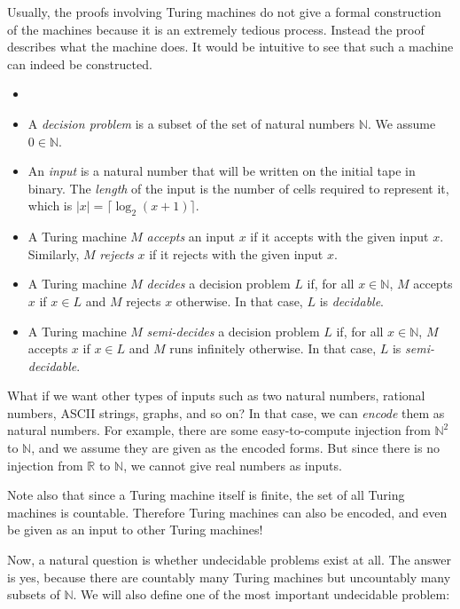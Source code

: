 	Usually, the proofs involving Turing machines do not give a formal construction of the machines because it is an extremely tedious process. Instead the proof describes what the machine does. It would be intuitive to see that such a machine can indeed be constructed.
	
	\begin{defn} \label{def_problem} \begin{itemize}
	    \item []
	    \item A \emph{decision problem} is a subset of the set of natural numbers $\mathbb{N}$. We assume $0 \in \mathbb{N}$.
	    \item An \emph{input} is a natural number that will be written on the initial tape in binary. The \emph{length} of the input is the number of cells required to represent it, which is $|x| = \lceil \log_2 (x+1) \rceil$.
	    \item A Turing machine $M$ \emph{accepts} an input $x$ if it accepts with the given input $x$. Similarly, $M$ \emph{rejects} $x$ if it rejects with the given input $x$.
	    \item A Turing machine $M$ \emph{decides} a decision problem $L$ if, for all $x \in \mathbb{N}$, $M$ accepts $x$ if $x \in L$ and $M$ rejects $x$ otherwise. In that case, $L$ is \emph{decidable}.
	    \item A Turing machine $M$ \emph{semi-decides} a decision problem $L$ if, for all $x \in \mathbb{N}$, $M$ accepts $x$ if $x \in L$ and $M$ runs infinitely otherwise. In that case, $L$ is \emph{semi-decidable}.
	\end{itemize} \end{defn}
	
	What if we want other types of inputs such as two natural numbers, rational numbers, ASCII strings, graphs, and so on? In that case, we can \emph{encode} them as natural numbers. For example, there are some easy-to-compute injection from $\mathbb{N}^2$ to $\mathbb{N}$, and we assume they are given as the encoded forms. But since there is no injection from $\mathbb{R}$ to $\mathbb{N}$, we cannot give real numbers as inputs.
	
	Note also that since a Turing machine itself is finite, the set of all Turing machines is countable. Therefore Turing machines can also be encoded, and even be given as an input to other Turing machines!
	
	Now, a natural question is whether undecidable problems exist at all. The answer is yes, because there are countably many Turing machines but uncountably many subsets of $\mathbb{N}$. We will also define one of the most important undecidable problem:
	

